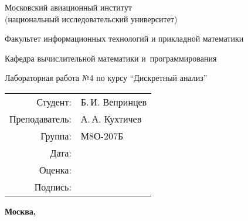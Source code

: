 \documentclass[pdf, unicode, 12pt, a4paper,oneside,fleqn]{article}
\begin{document}
\begin{titlepage}
    \begin{center}
    \bfseries
    
    {\Large Московский авиационный институт\\ (национальный исследовательский университет)
    
    }
  
    \vspace{48pt}
    
    {\large Факультет информационных технологий и прикладной математики
    }
    
    \vspace{36pt}
    
    
    {\large Кафедра вычислительной математики и~программирования
    
    }
    
    
    \vspace{48pt}
    
    Лабораторная работа №4 по курсу \enquote{Дискретный анализ}
    
    \end{center}
    
    \vspace{72pt}
    
    \begin{flushright}
    \begin{tabular}{rl}
    Студент: & Б.\,И. Вепринцев \\
    Преподаватель: & А.\,А. Кухтичев \\
    Группа: & М8О-207Б \\
    Дата: & \\
    Оценка: & \\
    Подпись: & \\
    \end{tabular}
    \end{flushright}
    
    \vfill
    
    \begin{center}
    \bfseries
    Москва, \the\year
    \end{center}
    \end{titlepage}
    \pagebreak


    \pagebreak
\end{document}
